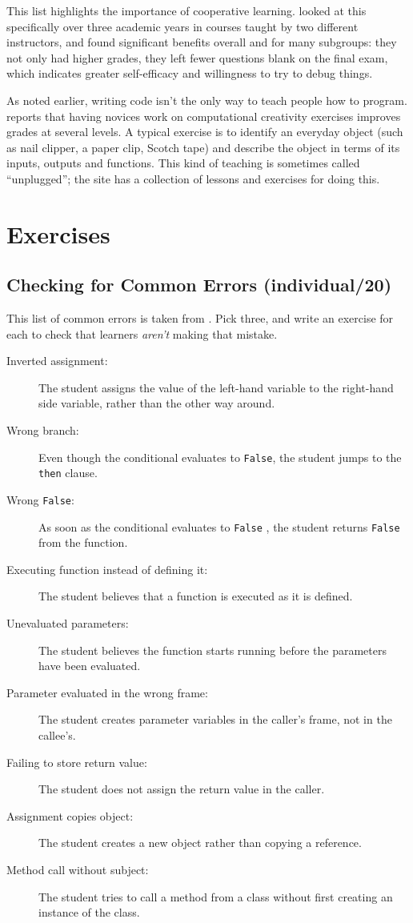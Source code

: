 This list highlights the importance of cooperative learning.
\cite{Beck2013} looked at this specifically over three academic years
in courses taught by two different instructors, and found significant
benefits overall and for many subgroups: they not only had higher
grades, they left fewer questions blank on the final exam, which
indicates greater self-efficacy and willingness to try to debug things.

As noted earlier, writing code isn't the only way to teach people how
to program. \cite{Shel2017} reports that having novices work on
computational creativity exercises improves grades at several
levels. A typical exercise is to identify an everyday object (such as
nail clipper, a paper clip, Scotch tape) and describe the object in
terms of its inputs, outputs and functions. This kind of teaching is
sometimes called ``unplugged''; the  site
has a collection of lessons and exercises for doing this.

\section{Exercises}\label{s:pck-exercises}

\subsection*{Checking for Common Errors (individual/20)}

This list of common errors is taken from \cite{Sirk2012}. Pick three,
and write an exercise for each to check that learners \emph{aren't} making
that mistake.

\begin{description}
\item[Inverted assignment:]
The student assigns the value of the left-hand variable to the
right-hand side variable, rather than the other way around.
\item[Wrong branch:]
Even though the conditional evaluates to \texttt{False}, the student jumps
to the \texttt{then} clause.
\item[Wrong \texttt{False}:]
As soon as the conditional evaluates to \texttt{False} , the student
returns \texttt{False} from the function.
\item[Executing function instead of defining it:]
The student believes that a function is executed as it is defined.
\item[Unevaluated parameters:]
The student believes the function starts running before the
parameters have been evaluated.
\item[Parameter evaluated in the wrong frame:]
The student creates parameter variables in the caller's frame, not
in the callee's.
\item[Failing to store return value:]
The student does not assign the return value in the caller.
\item[Assignment copies object:]
The student creates a new object rather than copying a reference.
\item[Method call without subject:]
The student tries to call a method from a class without first
creating an instance of the class.
\end{description}

